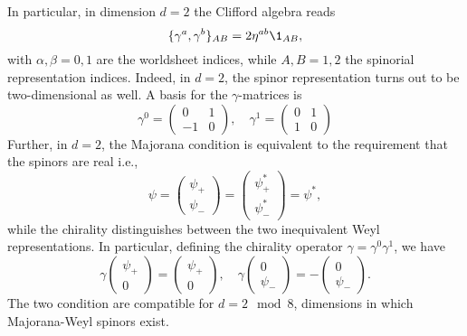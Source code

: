 In particular, in dimension $d=2$ the Clifford algebra reads
\begin{equation}
    \{ \gamma^a, \gamma^b \}_{AB} = 2 \eta^{ab} \1_{AB},
\end{equation}
with $\alpha,\beta = 0, 1$ are the worldsheet indices, while $A,B = 1,2$ the spinorial representation indices. Indeed, in $d=2$, the spinor representation turns out to be two-dimensional as well. A basis for the $\gamma$-matrices is
\begin{equation}
    \gamma^0 = \begin{pmatrix}
        0 & 1 \\
        -1 & 0
    \end{pmatrix}, \quad \gamma^1 = \begin{pmatrix}
        0 & 1 \\
        1 & 0
    \end{pmatrix}
\end{equation}
Further, in $d=2$, the Majorana condition is equivalent to the requirement that the spinors are real i.e.,
\begin{equation}
    \psi = \begin{pmatrix}
        \psi_+ \\ \psi_-
    \end{pmatrix} = \begin{pmatrix}
        \psi^*_+ \\ \psi^*_-
    \end{pmatrix} = \psi^*,
\end{equation}
while the chirality distinguishes between the two inequivalent Weyl representations. In particular, defining the chirality operator $\gamma = \gamma^0 \gamma^1$, we have
\begin{equation}
    \gamma \begin{pmatrix}
        \psi_+ \\ 0
    \end{pmatrix} = \begin{pmatrix}
        \psi_+ \\ 0
    \end{pmatrix}, \quad \gamma \begin{pmatrix}
        0 \\ \psi_-
    \end{pmatrix} = - \begin{pmatrix}
        0 \\ \psi_-
    \end{pmatrix}.
\end{equation}
The two condition are compatible for $d = 2 \mod 8$, dimensions in which Majorana-Weyl spinors exist.

